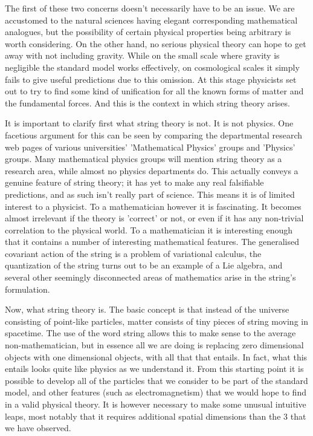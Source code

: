 \documentclass[a4paper,12pt]{article}
\numberwithin{equation}{section}
\begin{document}
The first of these two concerns doesn’t necessarily have to be an issue. We are accustomed to the natural sciences having elegant corresponding mathematical analogues, but the possibility of certain physical properties being arbitrary is worth considering. On the other hand, no serious physical theory can hope to get away with not including gravity. While on the small scale where gravity is negligible the standard model works effectively, on cosmological scales it simply fails to give useful predictions due to this omission. At this stage physicists set out to try to find some kind of unification for all the known forms of matter and the fundamental forces. And this is the context in which string theory arises.

It is important to clarify first what string theory is not. It is not physics. One facetious argument for this can be seen by comparing the departmental research web pages of various universities’ ’Mathematical Physics’ groups and ’Physics’ groups. Many mathematical physics groups will mention string theory as a research area, while almost no physics departments do. This actually conveys a genuine feature of string theory; it has yet to make any real falsifiable predictions, and as such isn’t
really part of science. This means it is of limited interest to a physicist. To a mathematician however it is fascinating. It becomes almost irrelevant if the theory is ’correct’ or not, or even if it has any non-trivial correlation to the physical world. To a mathematician it is interesting enough that it contains a number of interesting mathematical features. The generalised covariant action of the string is a problem of variational calculus, the quantization of the string turns out to be an example of a Lie algebra, and several other seemingly disconnected areas of mathematics arise in the string’s formulation.

Now, what string theory is. The basic concept is that instead of the universe consisting of point-like particles, matter consists of tiny pieces of string moving in spacetime. The use of the word string allows this to make sense to the average non-mathematician, but in essence all we are doing is replacing zero dimensional objects with one dimensional objects, with all that that entails. In fact, what this entails looks quite like physics as we understand it. From this starting point it is possible to develop all of the particles that we consider to be part of the standard model, and other features (such as electromagnetism) that we would hope to find in a valid physical theory. It is however necessary to make some unusual intuitive leaps, most notably that it requires additional spatial dimensions than the 3 that we have observed.
\end{document}
